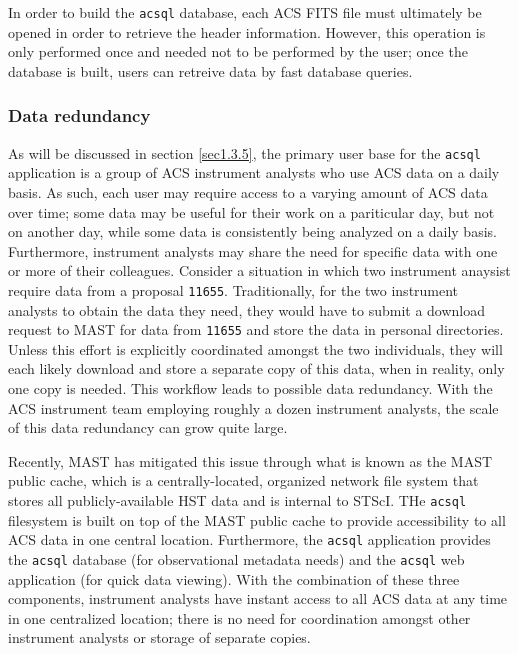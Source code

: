 \documentclass[10pt,journal,compsoc]{IEEEtran}
\begin{document}
In order to build the \texttt{acsql} database, each ACS FITS file must ultimately be opened in order to retrieve the header information.  However, this operation is only
performed once and needed not to be performed by the user; once the database is built, users can retreive data by fast database queries.


\subsubsection{Data redundancy} \label{1.3.3}

As will be discussed in section \ref{sec1.3.5}, the primary user base for the \texttt{acsql} application is a group of ACS instrument analysts who use ACS data on a daily
basis.  As such, each user may require access to a varying amount of ACS data over time; some data may be useful for their work on a pariticular day, but not on another day,
while some data is consistently being analyzed on a daily basis.  Furthermore, instrument analysts may share the need for specific data with one or more of their colleagues.
Consider a situation in which two instrument anaysist require data from a proposal \texttt{11655}. Traditionally, for the two instrument analysts to obtain the data they
need, they would have to submit a download request to MAST for data from \texttt{11655} and store the data in personal directories.  Unless this effort is explicitly
coordinated amongst the two individuals, they will each likely download and store a separate copy of this data, when in reality, only one copy is needed.  This workflow leads to
possible data redundancy.  With the ACS instrument team employing roughly a dozen instrument analysts, the scale of this data redundancy can grow quite large.

Recently, MAST has mitigated this issue through what is known as the MAST public cache, which is a centrally-located, organized network file system that stores all
publicly-available HST data and is internal to STScI.  THe \texttt{acsql} filesystem is built on top of the MAST public cache to provide accessibility to all ACS data in one
central location.  Furthermore, the \texttt{acsql} application provides the \texttt{acsql} database (for observational metadata needs) and the \texttt{acsql} web application
(for quick data viewing).  With the combination of these three components, instrument analysts have instant access to all ACS data at any time in one centralized location; there is
no need for coordination amongst other instrument analysts or storage of separate copies.
\end{document}
